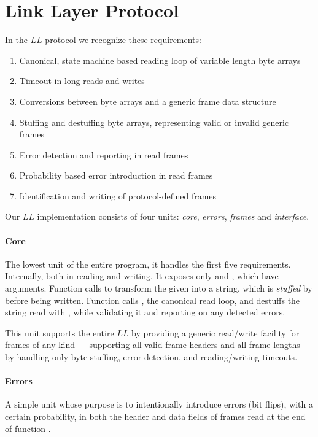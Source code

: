 \documentclass[main.tex]{subfiles}
\begin{document}
\section{Link Layer Protocol}
\label{sec:llprotocol}

In the $LL$ protocol we recognize these requirements:

\begin{enumerate}[label=(\alph*),noitemsep,rightmargin=3em]
	\item Canonical, state machine based reading loop of variable length byte arrays
	\item Timeout in long reads and writes
	\item Conversions between byte arrays and a generic frame data structure
	\item Stuffing and destuffing byte arrays, representing valid or invalid generic frames
	\item Error detection and reporting in read frames
	\item Probability based error introduction in read frames
	\item Identification and writing of protocol-defined frames
\end{enumerate}

Our $LL$ implementation consists of four units: \emph{core}, \emph{errors}, \emph{frames} and \emph{interface}.

\paragraph{Core} The lowest unit of the entire program, it handles the first five requirements. Internally, both in reading and writing. It exposes only  and , which have  arguments. Function  calls  to transform the given  into a string, which is \textit{stuffed} by  before being written. Function  calls , the canonical read loop, and destuffs the string read with , while validating it and reporting on any detected errors.

This unit supports the entire $LL$ by providing a generic read/write facility for frames of any kind --- supporting all valid frame headers and all frame lengths --- by handling only byte stuffing, error detection, and reading/writing timeouts.

\paragraph{Errors} A simple unit whose purpose is to intentionally introduce errors (bit flips), with a certain probability, in both the header and data fields of frames read at the end of function .
\end{document}
